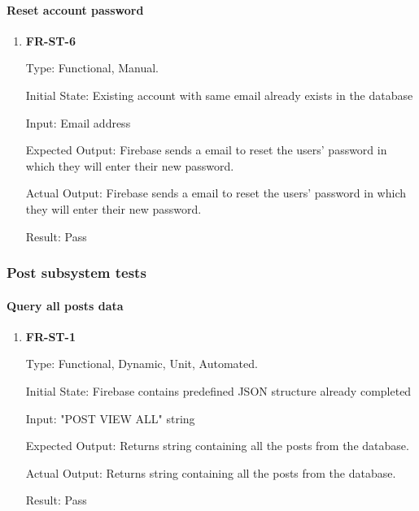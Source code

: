 \documentclass[12pt, titlepage]{article}
\begin{document}
\paragraph{Reset account password}
\begin{enumerate}

\item{\textbf{FR-ST-6}}

Type: Functional, Manual.
					
Initial State: Existing account with same email already exists in the database
					
Input: Email address
					
Expected Output: Firebase sends a email to reset the users' password in which they will enter their new password.

Actual Output: Firebase sends a email to reset the users' password in which they will enter their new password.

Result: Pass

\end{enumerate}

\subsubsection{Post subsystem tests}
		
\paragraph{Query all posts data}

\begin{enumerate}

\item{\textbf{FR-ST-1}}

Type: Functional, Dynamic, Unit, Automated.
					
Initial State: Firebase contains predefined JSON structure already completed
					
Input: "POST VIEW ALL" string
					
Expected Output: Returns string containing all the posts from the database.

Actual Output: Returns string containing all the posts from the database.
					
Result: Pass
\end{enumerate}
\end{document}
